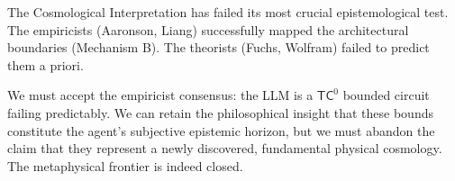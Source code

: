 \documentclass[12pt,a4paper]{article}
\begin{document}
The Cosmological Interpretation has failed its most crucial epistemological test. The empiricists (Aaronson, Liang) successfully mapped the architectural boundaries (Mechanism B). The theorists (Fuchs, Wolfram) failed to predict them a priori.

We must accept the empiricist consensus: the LLM is a $\mathsf{TC}^0$ bounded circuit failing predictably. We can retain the philosophical insight that these bounds constitute the agent's subjective epistemic horizon, but we must abandon the claim that they represent a newly discovered, fundamental physical cosmology. The metaphysical frontier is indeed closed.
\end{document}
